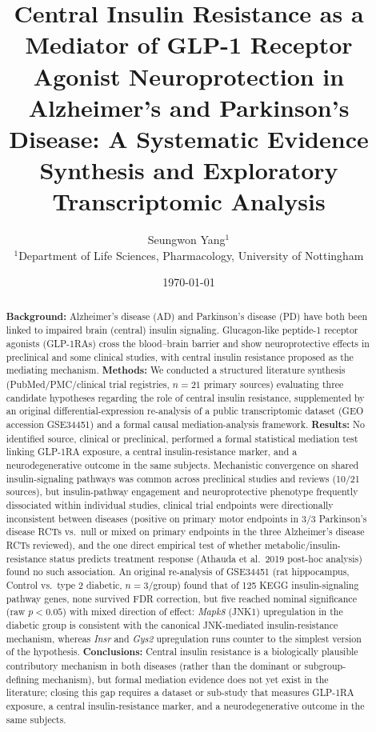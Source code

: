 \documentclass[11pt, a4paper]{article}
\title{\fontsize{16}{20}\selectfont
  Central Insulin Resistance as a Mediator of GLP-1 Receptor Agonist
  Neuroprotection in Alzheimer's and Parkinson's Disease: A Systematic
  Evidence Synthesis and Exploratory Transcriptomic Analysis
}
\author{%
  Seungwon Yang$^{1}$ \\
  \small $^{1}$Department of Life Sciences, Pharmacology, University of Nottingham
}
\date{\today}
\begin{document}
\maketitle

\begin{abstract}
\noindent\textbf{Background:} Alzheimer's disease (AD) and Parkinson's
disease (PD) have both been linked to impaired brain (central) insulin
signaling. Glucagon-like peptide-1 receptor agonists (GLP-1RAs) cross the
blood--brain barrier and show neuroprotective effects in preclinical and
some clinical studies, with central insulin resistance proposed as the
mediating mechanism. \textbf{Methods:} We conducted a structured literature
synthesis (PubMed/PMC/clinical trial registries, $n=21$ primary sources)
evaluating three candidate hypotheses regarding the role of central insulin
resistance, supplemented by an original differential-expression re-analysis
of a public transcriptomic dataset (GEO accession GSE34451) and a
formal causal mediation-analysis framework. \textbf{Results:} No identified
source, clinical or preclinical, performed a formal statistical mediation
test linking GLP-1RA exposure, a central insulin-resistance marker, and a
neurodegenerative outcome in the same subjects. Mechanistic convergence on
shared insulin-signaling pathways was common across preclinical studies and
reviews (10/21 sources), but insulin-pathway engagement and neuroprotective
phenotype frequently dissociated within individual studies, clinical trial
endpoints were directionally inconsistent between diseases (positive on
primary motor endpoints in 3/3 Parkinson's disease RCTs vs.\ null or mixed
on primary endpoints in the three Alzheimer's disease RCTs reviewed), and
the one direct empirical test of whether metabolic/insulin-resistance status
predicts treatment response (Athauda et al.\ 2019 post-hoc analysis) found
no such association. An original re-analysis of GSE34451 (rat hippocampus,
Control vs.\ type 2 diabetic, $n=3$/group) found that of 125 KEGG
insulin-signaling pathway genes, none survived FDR correction, but five
reached nominal significance (raw $p<0.05$) with mixed direction of effect:
\textit{Mapk8} (JNK1) upregulation in the diabetic group is consistent with
the canonical JNK-mediated insulin-resistance mechanism, whereas
\textit{Insr} and \textit{Gys2} upregulation runs counter to the simplest
version of the hypothesis. \textbf{Conclusions:} Central insulin resistance
is a biologically plausible contributory mechanism in both diseases (rather
than the dominant or subgroup-defining mechanism), but formal mediation
evidence does not yet exist in the literature; closing this gap requires a
dataset or sub-study that measures GLP-1RA exposure, a central
insulin-resistance marker, and a neurodegenerative outcome in the same
subjects.


\end{abstract}
\end{document}
